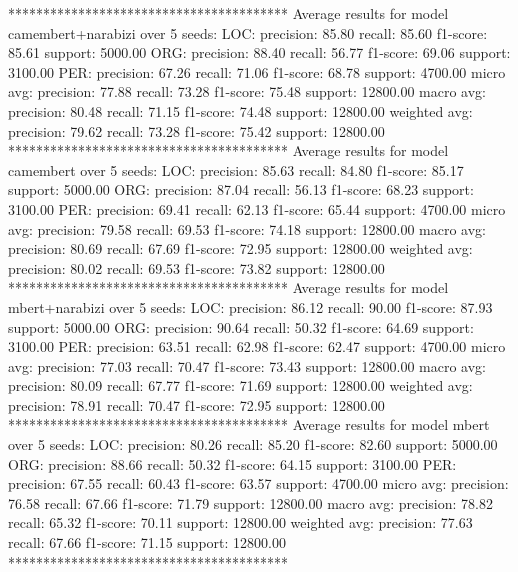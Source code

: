 
****************************************
Average results for model camembert+narabizi over 5 seeds:
  LOC:
    precision: 85.80
    recall: 85.60
    f1-score: 85.61
    support: 5000.00
  ORG:
    precision: 88.40
    recall: 56.77
    f1-score: 69.06
    support: 3100.00
  PER:
    precision: 67.26
    recall: 71.06
    f1-score: 68.78
    support: 4700.00
  micro avg:
    precision: 77.88
    recall: 73.28
    f1-score: 75.48
    support: 12800.00
  macro avg:
    precision: 80.48
    recall: 71.15
    f1-score: 74.48
    support: 12800.00
  weighted avg:
    precision: 79.62
    recall: 73.28
    f1-score: 75.42
    support: 12800.00
****************************************
Average results for model camembert over 5 seeds:
  LOC:
    precision: 85.63
    recall: 84.80
    f1-score: 85.17
    support: 5000.00
  ORG:
    precision: 87.04
    recall: 56.13
    f1-score: 68.23
    support: 3100.00
  PER:
    precision: 69.41
    recall: 62.13
    f1-score: 65.44
    support: 4700.00
  micro avg:
    precision: 79.58
    recall: 69.53
    f1-score: 74.18
    support: 12800.00
  macro avg:
    precision: 80.69
    recall: 67.69
    f1-score: 72.95
    support: 12800.00
  weighted avg:
    precision: 80.02
    recall: 69.53
    f1-score: 73.82
    support: 12800.00
****************************************
Average results for model mbert+narabizi over 5 seeds:
  LOC:
    precision: 86.12
    recall: 90.00
    f1-score: 87.93
    support: 5000.00
  ORG:
    precision: 90.64
    recall: 50.32
    f1-score: 64.69
    support: 3100.00
  PER:
    precision: 63.51
    recall: 62.98
    f1-score: 62.47
    support: 4700.00
  micro avg:
    precision: 77.03
    recall: 70.47
    f1-score: 73.43
    support: 12800.00
  macro avg:
    precision: 80.09
    recall: 67.77
    f1-score: 71.69
    support: 12800.00
  weighted avg:
    precision: 78.91
    recall: 70.47
    f1-score: 72.95
    support: 12800.00
****************************************
Average results for model mbert over 5 seeds:
  LOC:
    precision: 80.26
    recall: 85.20
    f1-score: 82.60
    support: 5000.00
  ORG:
    precision: 88.66
    recall: 50.32
    f1-score: 64.15
    support: 3100.00
  PER:
    precision: 67.55
    recall: 60.43
    f1-score: 63.57
    support: 4700.00
  micro avg:
    precision: 76.58
    recall: 67.66
    f1-score: 71.79
    support: 12800.00
  macro avg:
    precision: 78.82
    recall: 65.32
    f1-score: 70.11
    support: 12800.00
  weighted avg:
    precision: 77.63
    recall: 67.66
    f1-score: 71.15
    support: 12800.00
****************************************
